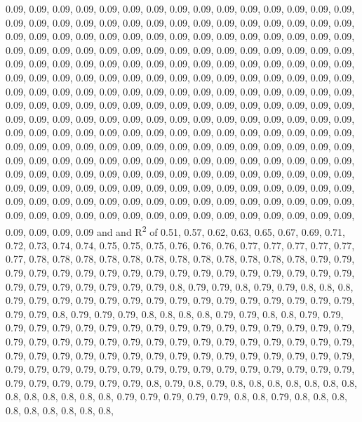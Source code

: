 \documentclass[11pt,]{article}
\begin{document}
0.09, 0.09, 0.09, 0.09, 0.09, 0.09, 0.09, 0.09, 0.09, 0.09, 0.09, 0.09,
0.09, 0.09, 0.09, 0.09, 0.09, 0.09, 0.09, 0.09, 0.09, 0.09, 0.09, 0.09,
0.09, 0.09, 0.09, 0.09, 0.09, 0.09, 0.09, 0.09, 0.09, 0.09, 0.09, 0.09,
0.09, 0.09, 0.09, 0.09, 0.09, 0.09, 0.09, 0.09, 0.09, 0.09, 0.09, 0.09,
0.09, 0.09, 0.09, 0.09, 0.09, 0.09, 0.09, 0.09, 0.09, 0.09, 0.09, 0.09,
0.09, 0.09, 0.09, 0.09, 0.09, 0.09, 0.09, 0.09, 0.09, 0.09, 0.09, 0.09,
0.09, 0.09, 0.09, 0.09, 0.09, 0.09, 0.09, 0.09, 0.09, 0.09, 0.09, 0.09,
0.09, 0.09, 0.09, 0.09, 0.09, 0.09, 0.09, 0.09, 0.09, 0.09, 0.09, 0.09,
0.09, 0.09, 0.09, 0.09, 0.09, 0.09, 0.09, 0.09, 0.09, 0.09, 0.09, 0.09,
0.09, 0.09, 0.09, 0.09, 0.09, 0.09, 0.09, 0.09, 0.09, 0.09, 0.09, 0.09,
0.09, 0.09, 0.09, 0.09, 0.09, 0.09, 0.09, 0.09, 0.09, 0.09, 0.09, 0.09,
0.09, 0.09, 0.09, 0.09, 0.09, 0.09, 0.09, 0.09, 0.09, 0.09, 0.09, 0.09,
0.09, 0.09, 0.09, 0.09, 0.09, 0.09, 0.09, 0.09, 0.09, 0.09, 0.09, 0.09,
0.09, 0.09, 0.09, 0.09, 0.09, 0.09, 0.09, 0.09, 0.09, 0.09, 0.09, 0.09,
0.09, 0.09, 0.09, 0.09, 0.09, 0.09, 0.09, 0.09, 0.09, 0.09, 0.09, 0.09,
0.09, 0.09, 0.09, 0.09, 0.09, 0.09, 0.09, 0.09, 0.09, 0.09, 0.09, 0.09,
0.09, 0.09, 0.09, 0.09, 0.09, 0.09, 0.09, 0.09, 0.09, 0.09, 0.09, 0.09,
0.09, 0.09, 0.09, 0.09, 0.09, 0.09, 0.09, 0.09, 0.09, 0.09, 0.09, 0.09,
0.09, 0.09, 0.09, 0.09, 0.09, 0.09, 0.09, 0.09, 0.09, 0.09, 0.09, 0.09,
0.09, 0.09, 0.09, 0.09, 0.09, 0.09, 0.09, 0.09, 0.09, 0.09, 0.09, 0.09,
0.09, 0.09, 0.09, 0.09 and and R\textsuperscript{2} of 0.51, 0.57, 0.62,
0.63, 0.65, 0.67, 0.69, 0.71, 0.72, 0.73, 0.74, 0.74, 0.75, 0.75, 0.75,
0.76, 0.76, 0.76, 0.77, 0.77, 0.77, 0.77, 0.77, 0.77, 0.78, 0.78, 0.78,
0.78, 0.78, 0.78, 0.78, 0.78, 0.78, 0.78, 0.78, 0.78, 0.79, 0.79, 0.79,
0.79, 0.79, 0.79, 0.79, 0.79, 0.79, 0.79, 0.79, 0.79, 0.79, 0.79, 0.79,
0.79, 0.79, 0.79, 0.79, 0.79, 0.79, 0.79, 0.79, 0.79, 0.8, 0.79, 0.79,
0.8, 0.79, 0.79, 0.8, 0.8, 0.8, 0.79, 0.79, 0.79, 0.79, 0.79, 0.79,
0.79, 0.79, 0.79, 0.79, 0.79, 0.79, 0.79, 0.79, 0.79, 0.79, 0.79, 0.8,
0.79, 0.79, 0.79, 0.8, 0.8, 0.8, 0.8, 0.79, 0.79, 0.8, 0.8, 0.79, 0.79,
0.79, 0.79, 0.79, 0.79, 0.79, 0.79, 0.79, 0.79, 0.79, 0.79, 0.79, 0.79,
0.79, 0.79, 0.79, 0.79, 0.79, 0.79, 0.79, 0.79, 0.79, 0.79, 0.79, 0.79,
0.79, 0.79, 0.79, 0.79, 0.79, 0.79, 0.79, 0.79, 0.79, 0.79, 0.79, 0.79,
0.79, 0.79, 0.79, 0.79, 0.79, 0.79, 0.79, 0.79, 0.79, 0.79, 0.79, 0.79,
0.79, 0.79, 0.79, 0.79, 0.79, 0.79, 0.79, 0.79, 0.79, 0.79, 0.79, 0.79,
0.79, 0.79, 0.79, 0.79, 0.79, 0.79, 0.8, 0.79, 0.8, 0.79, 0.8, 0.8, 0.8,
0.8, 0.8, 0.8, 0.8, 0.8, 0.8, 0.8, 0.8, 0.8, 0.8, 0.79, 0.79, 0.79,
0.79, 0.79, 0.8, 0.8, 0.79, 0.8, 0.8, 0.8, 0.8, 0.8, 0.8, 0.8, 0.8, 0.8,
\end{document}
